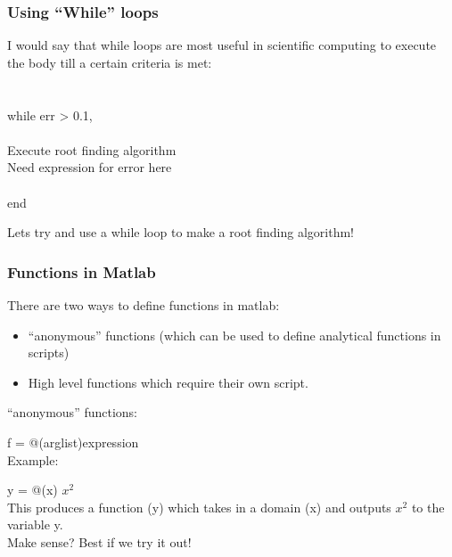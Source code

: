 \documentclass{beamer}
\newcommand{\tab}{\hspace{10mm}}
\begin{document}
\begin{frame}
\frametitle{Using ``While'' loops}

I would say that while loops are most useful in scientific computing to execute the body till a certain criteria is met:\\
\ \\
\ \\
while err > 0.1, \\
\ \\
\tab Execute root finding algorithm\\
\tab Need expression for error here\\
\ \\
end 

Lets try and use a while loop to make a root finding algorithm!
\end{frame}
%
\begin{frame}
\frametitle{Functions in Matlab} 

There are two ways to define functions in matlab: 
\begin{itemize}
\item ``anonymous'' functions (which can be used to define analytical functions in scripts) 
\item High level functions which require their own script. 
\end{itemize}
 ``anonymous'' functions: 

\tab \tab f = @(arglist)expression\\

Example: 

\tab \tab y = @(x) $x^2$ \\

This produces a function (y) which takes in a domain (x) and outputs $x^2$ to the variable y. \\
Make sense? Best if we try it out! 


\end{frame} 
%
%
\end{document}

